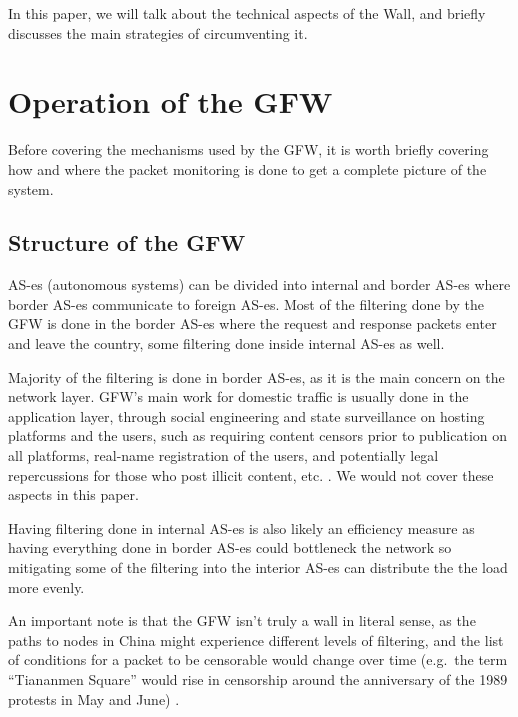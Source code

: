 \documentclass[nonacm,sigplan,screen]{acmart}
\begin{document}
In this paper, we will talk about the technical aspects of the Wall, and
briefly discusses the main strategies of circumventing it.

\hypertarget{-operation-of-the-gfw}{%
\section{Operation of the GFW}\label{ii.-operation-of-the-gfw}}

Before covering the mechanisms used by the GFW, it is worth briefly
covering how and where the packet monitoring is done to get a complete
picture of the system.


\hypertarget{structure-of-the-gfw}{%
\subsection{Structure of the GFW}\label{structure-of-the-gfw}}

AS-es (autonomous systems) can be divided into internal and border AS-es
where border AS-es communicate to foreign AS-es. Most of the filtering
done by the GFW is done in the border AS-es \cite{03_whereFilter} where
the request and response packets enter and leave the country, some
filtering done inside internal AS-es \cite{03_whereFilter} as well.

Majority of the filtering is done in border AS-es, as it is the main
concern on the network layer. GFW's main work for domestic traffic is
usually done in the application layer, through social engineering and
state surveillance on hosting platforms and the users, such as requiring
content censors prior to publication on all platforms, real-name
registration of the users, and potentially legal repercussions for those
who post illicit content, etc. \cite{04_digitalEco_mypaper}. We would
not cover these aspects in this paper.

Having filtering done in internal AS-es is also likely an efficiency
measure as having everything done in border AS-es could bottleneck the
network so mitigating some of the filtering into the interior AS-es can
distribute the the load more evenly.

An important note is that the GFW isn't truly a wall in literal sense,
as the paths to nodes in China might experience different levels of
filtering, and the list of conditions for a packet to be censorable
would change over time (e.g.~the term ``Tiananmen Square'' would rise in
censorship around the anniversary of the 1989 protests in May and June)
\cite{05_conceptDoppler}.
\end{document}
